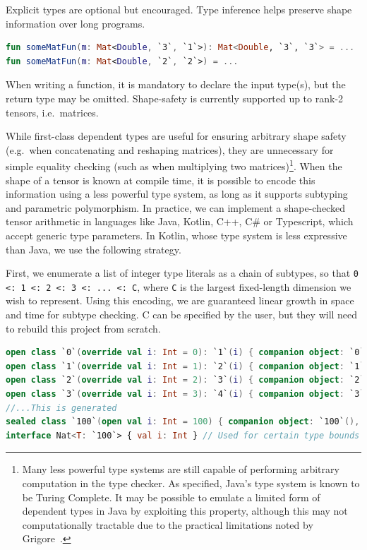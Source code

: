 \documentclass[12pt,initial,twoside,maitrise]{dms}
\numberwithin{equation}{section}
\numberwithin{table}{chapter}
\numberwithin{figure}{chapter}
\begin{document}
Explicit types are optional but encouraged. Type inference helps preserve shape information over long programs.

\begin{lstlisting}[language=Kotlin]
fun someMatFun(m: Mat<Double, `3`, `1`>): Mat<Double, `3`, `3`> = ...
fun someMatFun(m: Mat<Double, `2`, `2`>) = ...
\end{lstlisting}

When writing a function, it is mandatory to declare the input type(s), but the return type may be omitted. Shape-safety is currently supported up to rank-2 tensors, i.e.\ matrices.

While first-class dependent types are useful for ensuring arbitrary shape safety (e.g.\ when concatenating and reshaping matrices), they are unnecessary for simple equality checking (such as when multiplying two matrices)\footnote{Many less powerful type systems are still capable of performing arbitrary computation in the type checker. As specified, Java's type system is known to be Turing Complete. It may be possible to emulate a limited form of dependent types in Java by exploiting this property, although this may not computationally tractable due to the practical limitations noted by Grigore~\cite{Grigore:2017:JGT:3009837.3009871}.}. When the shape of a tensor is known at compile time, it is possible to encode this information using a less powerful type system, as long as it supports subtyping and parametric polymorphism. In practice, we can implement a shape-checked tensor arithmetic in languages like Java, Kotlin, C++, C\# or Typescript, which accept generic type parameters. In Kotlin, whose type system is less expressive than Java, we use the following strategy.

First, we enumerate a list of integer type literals as a chain of subtypes, so that \texttt{0 <: 1 <: 2 <: 3 <: ... <: C}, where \texttt{C} is the largest fixed-length dimension we wish to represent. Using this encoding, we are guaranteed linear growth in space and time for subtype checking. C can be specified by the user, but they will need to rebuild this project from scratch.

\begin{lstlisting}[language=Kotlin]
open class `0`(override val i: Int = 0): `1`(i) { companion object: `0`(), Nat<`0`> }
open class `1`(override val i: Int = 1): `2`(i) { companion object: `1`(), Nat<`1`> }
open class `2`(override val i: Int = 2): `3`(i) { companion object: `2`(), Nat<`2`> }
open class `3`(override val i: Int = 3): `4`(i) { companion object: `3`(), Nat<`3`> }
//...This is generated
sealed class `100`(open val i: Int = 100) { companion object: `100`(), Nat<`100`> }
interface Nat<T: `100`> { val i: Int } // Used for certain type bounds
\end{lstlisting}
\end{document}
